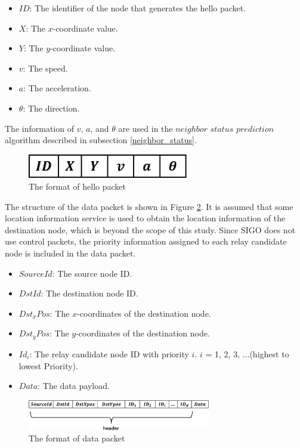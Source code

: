 \documentclass[conference]{IEEEtran}
\begin{document}
\begin{itemize}
\item $ID$: The identifier of the node that generates the hello packet.
\item $X$: The $x$-coordinate value.
\item $Y$: The $y$-coordinate value.
\item $v$: The speed.
\item $a$: The acceleration.
\item $\theta$: The direction.
\end{itemize}
The information of  $v$, $a$, and $\theta$ are used in the $neighbor$ $status$ $prediction$ algorithm described in subsection \ref{neighbor_status}.

\begin{figure}[!ht]
\centering
\includegraphics[width=70mm]{figures/hellopacket_format.eps}
\caption{The format of hello packet}
\label{fig:hellopacket}
\end{figure}

The structure of the data packet is shown in Figure \ref{fig:datapacket}. It is assumed that some location information service is used to obtain the location information of the destination node, which is beyond the scope of this study. 
Since SIGO does not use control packets, the priority information assigned to each relay candidate node is included in the data packet.

\begin{itemize}
\item $SourceId$: The source node ID.
\item $DstId$: The destination node ID.
\item $Dst_x Pos$: The $x$-coordinates of the destination node.
\item $Dst_y Pos$: The $y$-coordinates of the destination node.
\item $Id_i$: The relay candidate node ID with priority $i$. $i$ = 1, 2, 3, ...(highest to lowest Priority). 
\item $Data$: The data payload.
\end{itemize}

\begin{figure}[!ht]
\centering
\includegraphics[width=80mm]{figures/data_packet_format.eps}
\caption{The format of data packet}
\label{fig:datapacket}
\end{figure}
\end{document}
